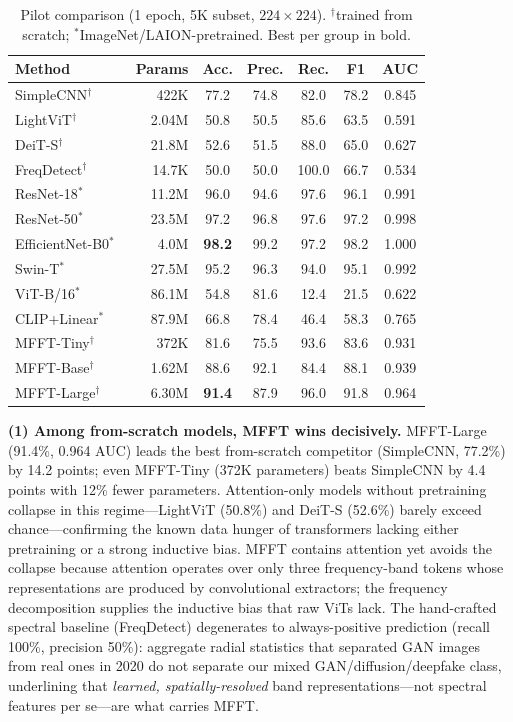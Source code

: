 \documentclass[journal]{IEEEtran}
\begin{document}
\begin{table}[!t]
\renewcommand{\arraystretch}{1.2}
\caption{Pilot comparison (1 epoch, 5K subset, $224\times224$). $^\dagger$trained from scratch; $^{*}$ImageNet/LAION-pretrained. Best per group in bold.}
\label{tab:main}
\centering
\setlength{\tabcolsep}{3.5pt}
\begin{tabular}{lrccccc}
\toprule
Method & Params & Acc. & Prec. & Rec. & F1 & AUC \\
\midrule
SimpleCNN$^\dagger$      & 422K   & 77.2 & 74.8 & 82.0 & 78.2 & 0.845 \\
LightViT$^\dagger$       & 2.04M  & 50.8 & 50.5 & 85.6 & 63.5 & 0.591 \\
DeiT-S$^\dagger$         & 21.8M  & 52.6 & 51.5 & 88.0 & 65.0 & 0.627 \\
FreqDetect$^\dagger$~\cite{frank2020} & 14.7K & 50.0 & 50.0 & 100.0 & 66.7 & 0.534 \\
\midrule
ResNet-18$^{*}$~\cite{he2016}    & 11.2M  & 96.0 & 94.6 & 97.6 & 96.1 & 0.991 \\
ResNet-50$^{*}$~\cite{he2016}    & 23.5M  & 97.2 & 96.8 & 97.6 & 97.2 & 0.998 \\
EfficientNet-B0$^{*}$~\cite{tan2019} & 4.0M & \textbf{98.2} & 99.2 & 97.2 & 98.2 & 1.000 \\
Swin-T$^{*}$~\cite{liu2021}      & 27.5M  & 95.2 & 96.3 & 94.0 & 95.1 & 0.992 \\
ViT-B/16$^{*}$~\cite{dosovitskiy2021} & 86.1M & 54.8 & 81.6 & 12.4 & 21.5 & 0.622 \\
CLIP+Linear$^{*}$~\cite{radford2021} & 87.9M & 66.8 & 78.4 & 46.4 & 58.3 & 0.765 \\
\midrule
MFFT-Tiny$^\dagger$  & 372K  & 81.6 & 75.5 & 93.6 & 83.6 & 0.931 \\
MFFT-Base$^\dagger$  & 1.62M & 88.6 & 92.1 & 84.4 & 88.1 & 0.939 \\
MFFT-Large$^\dagger$ & 6.30M & \textbf{91.4} & 87.9 & 96.0 & 91.8 & 0.964 \\
\bottomrule
\end{tabular}
\end{table}

\textbf{(1) Among from-scratch models, MFFT wins decisively.} MFFT-Large (91.4\%, 0.964 AUC) leads the best from-scratch competitor (SimpleCNN, 77.2\%) by 14.2 points; even MFFT-Tiny (372K parameters) beats SimpleCNN by 4.4 points with 12\% fewer parameters. Attention-only models without pretraining collapse in this regime---LightViT (50.8\%) and DeiT-S (52.6\%) barely exceed chance---confirming the known data hunger of transformers lacking either pretraining or a strong inductive bias. MFFT contains attention yet avoids the collapse because attention operates over only three frequency-band tokens whose representations are produced by convolutional extractors; the frequency decomposition supplies the inductive bias that raw ViTs lack. The hand-crafted spectral baseline (FreqDetect) degenerates to always-positive prediction (recall 100\%, precision 50\%): aggregate radial statistics that separated GAN images from real ones in 2020 do not separate our mixed GAN/diffusion/deepfake class, underlining that \emph{learned, spatially-resolved} band representations---not spectral features per se---are what carries MFFT.
\end{document}
